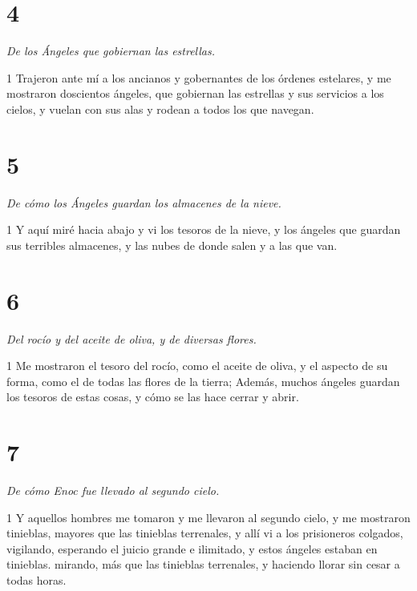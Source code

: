 \chapter{4}

\par \textit{De los Ángeles que gobiernan las estrellas.}

\par 1 Trajeron ante mí a los ancianos y gobernantes de los órdenes estelares, y me mostraron doscientos ángeles, que gobiernan las estrellas y sus servicios a los cielos, y vuelan con sus alas y rodean a todos los que navegan.

\chapter{5}

\par \textit{De cómo los Ángeles guardan los almacenes de la nieve.}

\par 1 Y aquí miré hacia abajo y vi los tesoros de la nieve, y los ángeles que guardan sus terribles almacenes, y las nubes de donde salen y a las que van.

\chapter{6}

\par \textit{Del rocío y del aceite de oliva, y de diversas flores.}

\par 1 Me mostraron el tesoro del rocío, como el aceite de oliva, y el aspecto de su forma, como el de todas las flores de la tierra; Además, muchos ángeles guardan los tesoros de estas cosas, y cómo se las hace cerrar y abrir.

\chapter{7}

\par \textit{De cómo Enoc fue llevado al segundo cielo.}

\par 1 Y aquellos hombres me tomaron y me llevaron al segundo cielo, y me mostraron tinieblas, mayores que las tinieblas terrenales, y allí vi a los prisioneros colgados, vigilando, esperando el juicio grande e ilimitado, y estos ángeles estaban en tinieblas. mirando, más que las tinieblas terrenales, y haciendo llorar sin cesar a todas horas.

